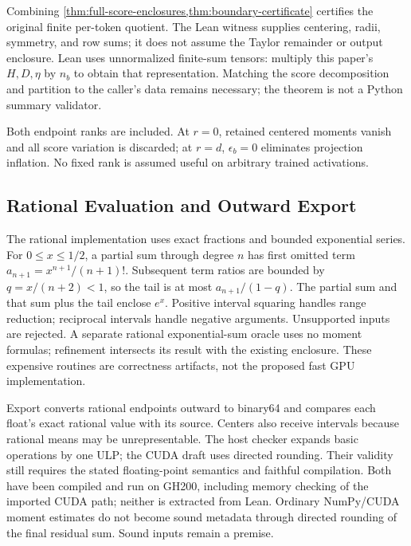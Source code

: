 Combining \cref{thm:full-score-enclosures,thm:boundary-certificate} certifies
the original finite per-token quotient. The Lean witness supplies centering,
radii, symmetry, and row sums; it does not assume the Taylor remainder or
output enclosure. Lean uses unnormalized finite-sum tensors: multiply this
paper's $H,D,\eta$ by $n_b$ to obtain that representation. Matching the score
decomposition and partition to the caller's data remains necessary; the
theorem is not a Python summary validator.

Both endpoint ranks are included. At $r=0$, retained centered moments vanish
and all score variation is discarded; at $r=d$, $\epsilon_b=0$ eliminates
projection inflation. No fixed rank is assumed useful on arbitrary trained
activations.

\subsection{Rational Evaluation and Outward Export}
\label{sec:rational-checking}

The rational implementation uses exact fractions and bounded exponential
series. For $0\le x\le1/2$, a partial sum through degree $n$ has first omitted
term $a_{n+1}=x^{n+1}/(n+1)!$. Subsequent term ratios are bounded by
$q=x/(n+2)<1$, so the tail is at most $a_{n+1}/(1-q)$.
The partial sum and that sum plus the tail enclose $e^x$. Positive interval
squaring handles range reduction; reciprocal intervals handle negative
arguments. Unsupported inputs are rejected. A separate rational
exponential-sum oracle uses no moment formulas; refinement intersects its
result with the existing enclosure. These expensive routines are correctness
artifacts, not the proposed fast GPU implementation.

Export converts rational endpoints outward to binary64 and compares each
float's exact rational value with its source. Centers also receive intervals
because rational means may be unrepresentable. The host checker expands basic
operations by one ULP; the CUDA draft uses directed rounding. Their validity
still requires the stated floating-point semantics and faithful compilation.
Both have been compiled and run on GH200, including memory checking of the
imported CUDA path; neither is extracted from Lean. Ordinary NumPy/CUDA
moment estimates do not become sound metadata through directed rounding of
the final residual sum. Sound inputs remain a premise.
